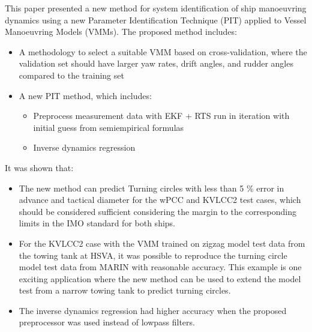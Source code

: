\documentclass[review]{elsarticle}
\begin{document}
This paper presented a new method for system identification of ship manoeuvring dynamics using a new Parameter Identification Technique (PIT) applied to Vessel Manoeuvring Models (VMMs). The proposed method includes:
\begin{itemize}
\item {} 
  
A methodology to select a suitable VMM based on cross-validation, where the validation set should have larger yaw rates, drift angles, and rudder angles compared to the training set

\item {} 
  
A new PIT method, which includes:
\begin{itemize}
\item {} 
  
Preprocess measurement data with EKF + RTS run in iteration with initial guess from semi\sphinxhyphen{}empirical formulas

\item {} 
  
Inverse dynamics regression

\end{itemize}

\end{itemize}

  
It was shown that:
\begin{itemize}
\item {} 
  
The new method can predict Turning circles with less than 5 \% error in advance and tactical diameter for the wPCC and KVLCC2 test cases, which should be considered sufficient considering the margin to the corresponding limits in the IMO standard for both ships.

\item {} 
  
For the KVLCC2 case with the VMM trained on zigzag model test data from the towing tank at HSVA, it was possible to reproduce the turning circle model test data from MARIN with reasonable accuracy. This example is one exciting application where the new method can be used to extend the model test from a narrow towing tank to predict turning circles.

\item {} 
  
The inverse dynamics regression had higher accuracy when the proposed preprocessor was used instead of low\sphinxhyphen{}pass filters.

\end{itemize}
\end{document}
